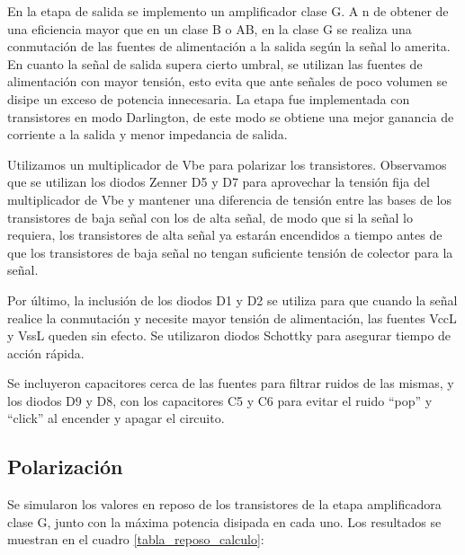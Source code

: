 \par En la etapa de salida se implemento un amplificador clase G. A n de obtener de una eficiencia mayor que en un clase B o AB, en la clase G se realiza una conmutación de las fuentes de alimentación a la salida según la señal lo amerita. En cuanto la señal de salida supera cierto umbral, se utilizan las fuentes de alimentación con mayor tensión, esto evita que ante señales de poco volumen se disipe un exceso de potencia innecesaria. La etapa fue implementada con transistores en modo Darlington, de este modo se obtiene una mejor ganancia de corriente a la salida y menor impedancia de salida.\\
\par Utilizamos un multiplicador de Vbe para polarizar los transistores. Observamos que se utilizan los diodos Zenner D5 y D7 para aprovechar la tensión fija del multiplicador de Vbe y mantener una diferencia de tensión entre las bases de los transistores de baja señal con los de alta señal, de modo que si la señal lo requiera, los transistores de alta señal ya estarán encendidos a tiempo antes de que los transistores de baja señal no tengan suficiente tensión de colector para la señal.\\

\par Por último, la inclusión de los diodos D1 y D2 se utiliza para que cuando la señal realice la conmutación y necesite mayor tensión de alimentación, las fuentes VccL y VssL queden sin efecto. Se utilizaron diodos Schottky para asegurar tiempo de acción rápida.\\

\par Se incluyeron capacitores cerca de las fuentes para filtrar ruidos de las mismas, y los diodos D9 y D8, con los capacitores C5 y C6 para evitar el ruido ``pop'' y ``click'' al encender y apagar el circuito.\\

\subsection{Polarización}

\par Se simularon los valores en reposo de los transistores de la etapa amplificadora clase G, junto con la máxima potencia disipada en cada uno. Los resultados se muestran en el cuadro \ref{tabla_reposo_calculo}:


